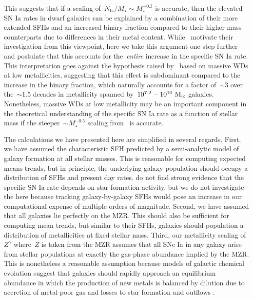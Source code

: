 \documentclass[ms.tex]{subfiles}
\begin{document}
This suggests that if a scaling of~$\dot{N}_\text{Ia} / M_\star \sim
M_\star^{-0.3}$ is accurate, then the elevated SN Ia rates in dwarf galaxies
can be explained by a combination of their more extended SFHs and an increased
binary fraction compared to their higher mass counterparts due to differences
in their metal content.
While~\citet{Gandhi2022} motivate their investigation from this viewpoint, here
we take this argument one step further and postulate that this accounts for
the~\textit{entire} increase in the specific SN Ia rate.
This interpretation goes against the hypothesis raised by~\citet{Kistler2013}
based on massive WDs at low metallicities, suggesting that this effect is
subdominant compared to the increase in the binary fraction, which naturally
accounts for a factor of~$\sim$3 over the~$\sim$1.5 decades in metallicity
spanned by~$10^{7.2} - 10^{10}~\text{M}_\odot$ galaxies.
Nonetheless, massive WDs at low metallicity may be an important component in
the theoretical understanding of the specific SN Ia rate as a function of
stellar mass if the steeper~$\sim M_\star^{-0.5}$ scaling from~\citet{Brown2019}
is accurate.
\par
The calculations we have presented here are simplified in several regards.
First, we have assumed the characteristic SFH predicted by a semi-analytic
model of galaxy formation at all stellar masses.
This is reasonable for computing expected means trends, but in principle, the
underlying galaxy population should occupy a distribution of SFHs and present
day rates.
\citet{Brown2019} do not find strong evidence that the specific SN Ia rate
depends on star formation activity, but we do not investigate the here because
tracking galaxy-by-galaxy SFHs would pose an increase in our computational
expense of multiple orders of magnitude.
Second, we have assumed that all galaxies lie perfectly on the MZR.
This should also be sufficient for computing mean trends, but similar to their
SFHs, galaxies should population a distribution of metallicities at fixed
stellar mass.
Third, our metallicity scaling of~$Z^\gamma$ where~$Z$ is taken from the
\citet{Zahid2014} MZR assumes that all SNe Ia in any galaxy arise from stellar
populations at exactly the gas-phase abundance implied by the MZR.
This is nonetheless a reasonable assumption because models of galactic chemical
evolution suggest that galaxies should rapidly approach an equilibrium
abundance in which the production of new metals is balanced by dilution due to
accretion of metal-poor gas and losses to star formation and outflows
\citep{Larson1972, Weinberg2017}.
\end{document}
